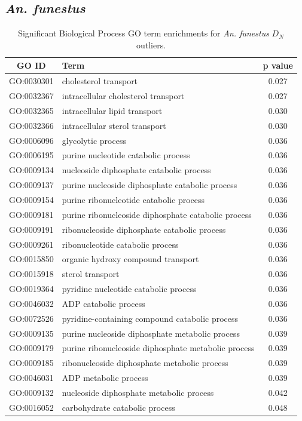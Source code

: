 \subsection{\textit{An. funestus}}
\begin{table}[H]
    \centering
    \begin{tabular}{clc}
        \toprule
        \textbf{GO ID}& \textbf{Term} & \textbf{p value}\\
        \midrule
        GO:0030301 & cholesterol transport & 0.027 \\ 
        GO:0032367 & intracellular cholesterol transport & 0.027 \\ 
        GO:0032365 & intracellular lipid transport & 0.030\\ 
        GO:0032366 & intracellular sterol transport & 0.030\\ 
        GO:0006096 & glycolytic process & 0.036 \\ 
        GO:0006195 & purine nucleotide catabolic process & 0.036 \\ 
        GO:0009134 & nucleoside diphosphate catabolic process & 0.036 \\ 
        GO:0009137 & purine nucleoside diphosphate catabolic process& 0.036 \\ 
        GO:0009154 & purine ribonucleotide catabolic process & 0.036 \\ 
        GO:0009181 & purine ribonucleoside diphosphate catabolic process& 0.036 \\ 
        GO:0009191 & ribonucleoside diphosphate catabolic process& 0.036 \\ 
        GO:0009261 & ribonucleotide catabolic process & 0.036 \\ 
        GO:0015850 & organic hydroxy compound transport & 0.036 \\ 
        GO:0015918 & sterol transport & 0.036 \\ 
        GO:0019364 & pyridine nucleotide catabolic process & 0.036 \\ 
        GO:0046032 & ADP catabolic process & 0.036 \\ 
        GO:0072526 & pyridine-containing compound catabolic process& 0.036 \\ 
        GO:0009135 & purine nucleoside diphosphate metabolic process& 0.039 \\ 
        GO:0009179 & purine ribonucleoside diphosphate metabolic process& 0.039 \\ 
        GO:0009185 & ribonucleoside diphosphate metabolic process& 0.039 \\ 
        GO:0046031 & ADP metabolic process & 0.039 \\ 
        GO:0009132 & nucleoside diphosphate metabolic process & 0.042 \\ 
        GO:0016052 & carbohydrate catabolic process & 0.048 \\ \bottomrule
    \end{tabular}

    \caption{Significant Biological Process GO term enrichments for \textit{An. funestus} $D_N$ outliers.}
    \label{afunGOd}
    
\end{table}


